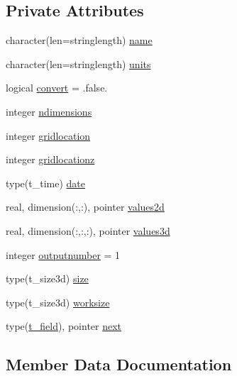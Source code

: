 \subsection*{Private Attributes}
\begin{DoxyCompactItemize}
\item 
character(len=stringlength) \mbox{\hyperlink{structmodulemm5format_1_1t__field_ac8de1d9effebe93facf9f7f3bf42ada3}{name}}
\item 
character(len=stringlength) \mbox{\hyperlink{structmodulemm5format_1_1t__field_a2ed796a17eb539d448cd371fc87da00d}{units}}
\item 
logical \mbox{\hyperlink{structmodulemm5format_1_1t__field_a1e2baceb5a2c7e000355509a0887f06f}{convert}} = .false.
\item 
integer \mbox{\hyperlink{structmodulemm5format_1_1t__field_a82c2fc950b464fea4cedab4048afddef}{ndimensions}}
\item 
integer \mbox{\hyperlink{structmodulemm5format_1_1t__field_ac733c5678300bfed0b9dede92d8a902e}{gridlocation}}
\item 
integer \mbox{\hyperlink{structmodulemm5format_1_1t__field_a85c79d2e8f62ed36ccea9425b471a96f}{gridlocationz}}
\item 
type(t\+\_\+time) \mbox{\hyperlink{structmodulemm5format_1_1t__field_a96a770d82bfa346fcb3d8767ae05f947}{date}}
\item 
real, dimension(\+:,\+:), pointer \mbox{\hyperlink{structmodulemm5format_1_1t__field_a04c319a7ec55ed3fa11e7bf8873ecaf9}{values2d}}
\item 
real, dimension(\+:,\+:,\+:), pointer \mbox{\hyperlink{structmodulemm5format_1_1t__field_a217b9a32d3ab47816680434f225b5870}{values3d}}
\item 
integer \mbox{\hyperlink{structmodulemm5format_1_1t__field_a45e2db7bab844790ad586e05718ad436}{outputnumber}} = 1
\item 
type(t\+\_\+size3d) \mbox{\hyperlink{structmodulemm5format_1_1t__field_ad5c8855aec44404af0799072900ddd58}{size}}
\item 
type(t\+\_\+size3d) \mbox{\hyperlink{structmodulemm5format_1_1t__field_aa7dc209aec17c604adceb0510fda5540}{worksize}}
\item 
type(\mbox{\hyperlink{structmodulemm5format_1_1t__field}{t\+\_\+field}}), pointer \mbox{\hyperlink{structmodulemm5format_1_1t__field_a5f7e8e5146285e3385e1a7c835729112}{next}}
\end{DoxyCompactItemize}


\subsection{Member Data Documentation}
\mbox{\label{structmodulemm5format_1_1t__field_a1e2baceb5a2c7e000355509a0887f06f}} 
